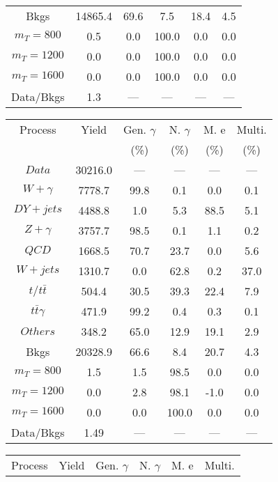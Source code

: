 \begin{figure}
\begin{minipage}[c]{0.32\textwidth}
{\begin{tabular}{cccccc}
Bkgs &  14865.4 &  69.6 &  7.5 &  18.4 &  4.5\\
$ m_{T} = 800 $ &  0.5 &  0.0 &  100.0 &  0.0 &  0.0\\
$ m_{T} = 1200 $ &  0.0 &  0.0 &  100.0 &  0.0 &  0.0\\
$ m_{T} = 1600 $ &  0.0 &  0.0 &  100.0 &  0.0 &  0.0\\
Data/Bkgs &  1.3 &  --- &  --- &  --- &  ---\\
\hline
\end{tabular}
}
\end{minipage}
\begin{minipage}[c]{0.32\textwidth}
\centering
\tiny{
\begin{tabular}{cccccc}
\hline
Process & Yield & Gen. $\gamma$ & N. $\gamma$ & M. e & Multi. \\
 &  & (\%) & (\%) & (\%) & (\%)  \\
\hline
                                                                      $ Data $ &  30216.0 &  --- &  --- &  --- &  ---\\
$ W+\gamma $ &  7778.7 &  99.8 &  0.1 &  0.0 &  0.1\\
$ DY+jets $ &  4488.8 &  1.0 &  5.3 &  88.5 &  5.1\\
$ Z+\gamma $ &  3757.7 &  98.5 &  0.1 &  1.1 &  0.2\\
$ QCD $ &  1668.5 &  70.7 &  23.7 &  0.0 &  5.6\\
$ W+jets $ &  1310.7 &  0.0 &  62.8 &  0.2 &  37.0\\
$ t/t\bar{t} $ &  504.4 &  30.5 &  39.3 &  22.4 &  7.9\\
$ t\bar{t}\gamma $ &  471.9 &  99.2 &  0.4 &  0.3 &  0.1\\
$ Others $ &  348.2 &  65.0 &  12.9 &  19.1 &  2.9\\
Bkgs &  20328.9 &  66.6 &  8.4 &  20.7 &  4.3\\
$ m_{T} = 800 $ &  1.5 &  1.5 &  98.5 &  0.0 &  0.0\\
$ m_{T} = 1200 $ &  0.0 &  2.8 &  98.1 &  -1.0 &  0.0\\
$ m_{T} = 1600 $ &  0.0 &  0.0 &  100.0 &  0.0 &  0.0\\
Data/Bkgs &  1.49 &  --- &  --- &  --- &  ---\\
\hline
\end{tabular}
}
\end{minipage}
\begin{minipage}[c]{0.32\textwidth}
\centering
\tiny{
\begin{tabular}{cccccc}
\hline
Process & Yield & Gen. $\gamma$ & N. $\gamma$ & M. e & Multi. \\

\end{tabular}}
\end{minipage}
\end{figure}
